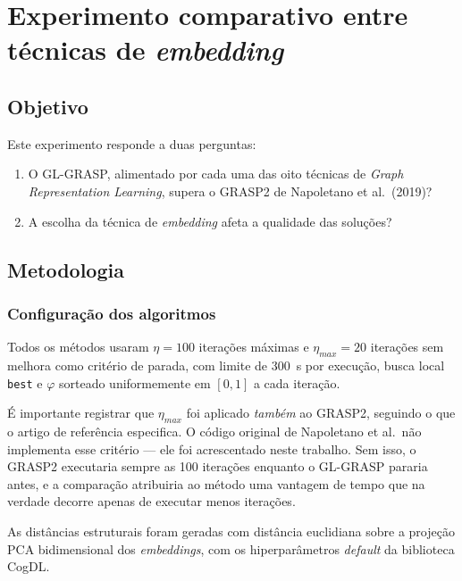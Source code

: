 \documentclass[12pt,a4paper]{article}
\begin{document}
\section{Experimento comparativo entre técnicas de \textit{embedding}}
\label{sec:experimento-tecnicas}

\subsection{Objetivo}

Este experimento responde a duas perguntas:

\begin{enumerate}
  \item O GL-GRASP, alimentado por cada uma das oito técnicas de
        \textit{Graph Representation Learning}, supera o GRASP2 de
        Napoletano et al.\ (2019)?
  \item A escolha da técnica de \textit{embedding} afeta a qualidade das
        soluções?
\end{enumerate}

\subsection{Metodologia}
\label{sec:metodologia-exp}

\subsubsection{Configuração dos algoritmos}

Todos os métodos usaram $\eta = 100$ iterações máximas e
$\eta_{max} = 20$ iterações sem melhora como critério de parada, com
limite de \SI{300}{\second} por execução, busca local \texttt{best} e
$\varphi$ sorteado uniformemente em $[0,1]$ a cada iteração.

É importante registrar que $\eta_{max}$ foi aplicado \emph{também} ao
GRASP2, seguindo o que o artigo de referência especifica. O código
original de Napoletano et al.\ não implementa esse critério --- ele foi
acrescentado neste trabalho. Sem isso, o GRASP2 executaria sempre as 100
iterações enquanto o GL-GRASP pararia antes, e a comparação atribuiria ao
método uma vantagem de tempo que na verdade decorre apenas de executar
menos iterações.

As distâncias estruturais foram geradas com distância euclidiana sobre a
projeção PCA bidimensional dos \textit{embeddings}, com os
hiperparâmetros \textit{default} da biblioteca CogDL.
\end{document}
